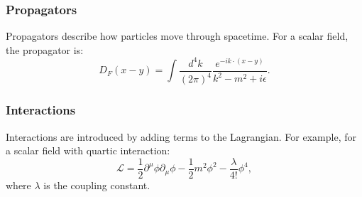 \subsubsection{Propagators}
Propagators describe how particles move through spacetime. For a scalar field, the propagator is:
\[
D_F(x - y) = \int \frac{d^4k}{(2\pi)^4} \frac{e^{-i k \cdot (x - y)}}{k^2 - m^2 + i\epsilon}.
\]

\subsubsection{Interactions}
Interactions are introduced by adding terms to the Lagrangian. For example, for a scalar field with quartic interaction:
\[
\mathcal{L} = \frac{1}{2} \partial^\mu \phi \partial_\mu \phi - \frac{1}{2}m^2\phi^2 - \frac{\lambda}{4!}\phi^4,
\]
where \(\lambda\) is the coupling constant.


